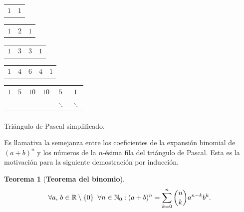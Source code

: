 \documentclass{article}
\theoremstyle{definition}
\newtheorem{teor}{Teorema}
\begin{document}
\begin{multicols}{2}
\begin{center}
\begin{tabular}
{c c}
$1$ & $1$\\
\end{tabular}

\begin{tabular}
{ c c c}
$1$ & $2$ & $1$\\
\end{tabular}

\begin{tabular}
{c c c c}
$1$ & $3$ & $3$ & $1$\\
\end{tabular}

\begin{tabular}
{c c c c c}
$1$ & $4$ & $6$ & $4$ & $1$\\
\end{tabular}

\begin{tabular}
{c c c c c c}
$1$ & $5$ & $10$ & $10$ & $5$ & $1$\\
{$\ddots$} & {$\ddots$} &  &  & $\ddots$ & $\ddots$\\

\end{tabular}

\paragraph{}
Triángulo de Pascal simplificado.

\end{center}
\end{multicols}
Es llamativa la semejanza entre los coeficientes de la expansión binomial de $(a+b)^n$ y los números de la $n$-ésima fila del triángulo de Pascal. Esta es la motivación para la siguiente demostración por inducción.
\begin{teor}[\textbf{Teorema del binomio}] $$\forall a \textnormal{, } b \in \mathbb{R}\setminus \{0\} \; \; \forall n \in \mathbb{N}_0 : (a+b)^n= \displaystyle \sum_{k=0}^{n} \displaystyle \binom{n}{k} a^{n-k}b^{k}.$$
\end{teor}
\end{document}
